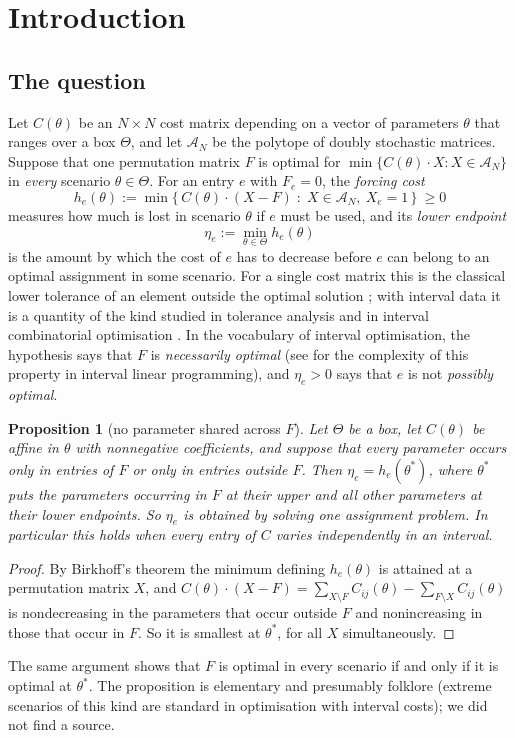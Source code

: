 \documentclass[11pt]{amsart}
\theoremstyle{plain}
\newtheorem{proposition}[theorem]{Proposition}
\theoremstyle{definition}
\theoremstyle{remark}
\newcommand{\cA}{\mathcal{A}}
\begin{document}
\maketitle

\section{Introduction}

\subsection*{The question}
Let $C(\theta)$ be an $N\times N$ cost matrix depending on a vector of parameters $\theta$ that ranges over a box
$\Theta$, and let $\cA_N$ be the polytope of doubly stochastic matrices. Suppose that one permutation matrix $F$ is
optimal for $\min\{C(\theta)\cdot X:X\in\cA_N\}$ in \emph{every} scenario $\theta\in\Theta$. For an entry $e$ with
$F_e=0$, the \emph{forcing cost}
\[
 h_e(\theta):=\min\{\,C(\theta)\cdot(X-F)\;:\;X\in\cA_N,\ X_e=1\,\}\ \ge0
\]
measures how much is lost in scenario $\theta$ if $e$ must be used, and its \emph{lower endpoint}
\[
 \eta_e:=\min_{\theta\in\Theta}h_e(\theta)
\]
is the amount by which the cost of $e$ has to decrease before $e$ can belong to an optimal assignment in some
scenario. For a single cost matrix this is the classical lower tolerance of an element outside the optimal solution
\cite{GJM,LinWen}; with interval data it is a quantity of the kind studied in tolerance analysis and in interval
combinatorial optimisation \cite{Wendell,Hladik11,Hladik26,KZ}. In the vocabulary of interval optimisation, the
hypothesis says that $F$ is \emph{necessarily optimal} (see \cite{Hladik12} for the complexity of this property in
interval linear programming), and $\eta_e>0$ says that $e$ is not \emph{possibly optimal}.

\begin{proposition}[no parameter shared across $F$]\label{prop:indep}
Let $\Theta$ be a box, let $C(\theta)$ be affine in $\theta$ with nonnegative coefficients, and suppose that every
parameter occurs only in entries of $F$ or only in entries outside $F$. Then $\eta_e=h_e(\theta^\ast)$, where
$\theta^\ast$ puts the parameters occurring in $F$ at their upper and all other parameters at their lower endpoints.
So $\eta_e$ is obtained by solving one assignment problem. In particular this holds when every entry of $C$ varies
independently in an interval.
\end{proposition}
\begin{proof}
By Birkhoff's theorem the minimum defining $h_e(\theta)$ is attained at a permutation matrix $X$, and
$C(\theta)\cdot(X-F)=\sum_{X\setminus F}C_{ij}(\theta)-\sum_{F\setminus X}C_{ij}(\theta)$ is nondecreasing in the
parameters that occur outside $F$ and nonincreasing in those that occur in $F$. So it is smallest at
$\theta^\ast$, for all $X$ simultaneously.
\end{proof}
The same argument shows that $F$ is optimal in every scenario if and only if it is optimal at $\theta^\ast$. The
proposition is elementary and presumably folklore (extreme scenarios of this kind are standard in optimisation with
interval costs); we did not find a source.
\end{document}
